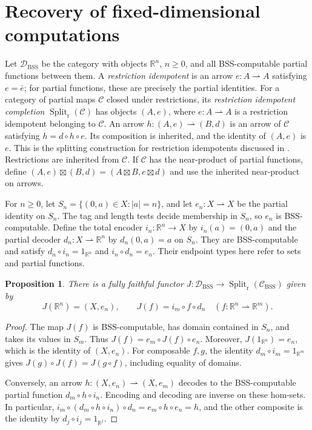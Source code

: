\documentclass[11pt]{article}
\newtheorem{proposition}[theorem]{Proposition}
\newcommand{\R}{\mathbb R}
\newcommand{\C}{\mathcal C_{\mathrm{BSS}}}
\newcommand{\D}{\mathcal D_{\mathrm{BSS}}}
\newcommand{\pfn}{\rightharpoonup}
\newcommand{\Split}{\operatorname{Split}_{\mathrm r}}
\begin{document}
\section{Recovery of fixed-dimensional computations}
\label{sec:typed}

Let $\D$ be the category with objects $\R^n$, $n\geq0$, and all
BSS-computable partial functions between them. A \emph{restriction
idempotent} is an arrow $e:A\pfn A$ satisfying $e=\bar e$;
for partial functions, these are precisely the partial identities.
For a category of partial maps $\mathcal C$ closed under restrictions,
its \emph{restriction idempotent completion} $\Split(\mathcal C)$
has objects $(A,e)$, where $e:A\pfn A$ is a restriction idempotent
belonging to $\mathcal C$.
An arrow $h:(A,e)\pfn(B,d)$ is an arrow of $\mathcal C$ satisfying
$h=d\circ h\circ e$. Its composition is inherited, and the identity
of $(A,e)$ is $e$. This is the splitting construction for restriction
idempotents discussed in \cite[\S2.1, p.~187]{CockettHofstra08}.
Restrictions are inherited from $\mathcal C$. If $\mathcal C$ has
the near-product of partial functions, define
$(A,e)\boxtimes(B,d)=(A\boxtimes B,e\boxtimes d)$ and use
the inherited near-product on arrows.

For $n\geq0$, let $S_n=\{(0,a)\in X:|a|=n\}$, and let
$e_n:X\pfn X$ be the partial identity on $S_n$.
The tag and length tests decide membership in $S_n$, so $e_n$
is BSS-computable. Define the total encoder
$i_n:\R^n\to X$ by $i_n(a)=(0,a)$ and the partial decoder
$d_n:X\pfn\R^n$ by $d_n(0,a)=a$ on $S_n$.
They are BSS-computable and satisfy
$d_n\circ i_n=1_{\R^n}$ and $i_n\circ d_n=e_n$.
Their endpoint types here refer to sets and partial functions.

\begin{proposition}\label{prop:embedding}
There is a fully faithful functor
$J:\D\to\Split(\C)$ given by
\[
 J(\R^n)=(X,e_n),\qquad
 J(f)=i_m\circ f\circ d_n
 \quad(f:\R^n\pfn\R^m).
\]
\end{proposition}

\begin{proof}
The map $J(f)$ is BSS-computable, has domain contained in $S_n$,
and takes its values in $S_m$. Thus
$J(f)=e_m\circ J(f)\circ e_n$.
Moreover, $J(1_{\R^n})=e_n$, which is the identity of $(X,e_n)$.
For composable $f,g$, the identity $d_m\circ i_m=1_{\R^m}$
gives $J(g)\circ J(f)=J(g\circ f)$, including equality of domains.

Conversely, an arrow $h:(X,e_n)\pfn(X,e_m)$ decodes to the
BSS-computable partial function $d_m\circ h\circ i_n$.
Encoding and decoding are inverse on these hom-sets. In particular,
$i_m\circ(d_m\circ h\circ i_n)\circ d_n
=e_m\circ h\circ e_n=h$, and the other composite is the identity
by $d_j\circ i_j=1_{\R^j}$.
\end{proof}
\end{document}

